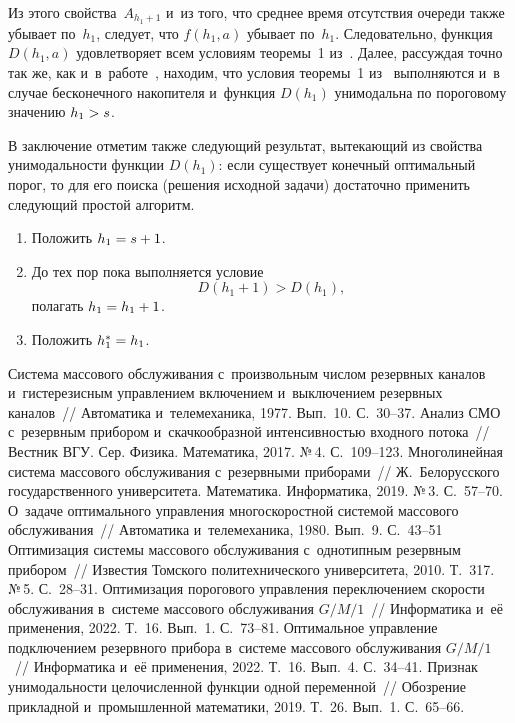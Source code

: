 \begin{multicols}{2}
   Из этого свойства~$A_{h_1+1}$ и~из того, что сред\-нее время отсутствия 
очереди также убывает по~$h_1$, следует, что $f(h_1,a)$ убывает по~$h_1$. 
Следовательно, функция $D(h_1,a)$ удовлетворяет всем условиям тео\-ре\-мы~1 
из~\cite{8-al}. Далее, рас\-суж\-дая точ\-но так же, как и~в~работе~\cite{7-al}, 
находим, что условия тео\-ре\-мы~1 из~\cite{8-al} выполняются и~в случае 
бесконечного накопителя и~функция $D(h_1)$ унимодальна по пороговому 
значению $h_1\hm>s$.
    
  В заключение отметим также сле\-ду\-ющий результат, вытекающий из свойства 
уни\-мо\-даль\-ности функции $D(h_1)$: если существует конечный оптимальный 
порог, то для его поиска (решения исходной задачи) достаточно применить 
сле\-ду\-ющий прос\-той алгоритм.
  \begin{enumerate}[1.]
\item Положить $h_1\hm= s\hm+1$. 
\item До тех пор пока выполняется условие 
$$
D\left(h_1+1\right)> D\left(h_1\right),
$$ 
полагать $h_1 \hm= h_1\hm+1$.
\item Положить $h_1^*\hm=h_1$. 
\end{enumerate}

{\small\frenchspacing
 {%
 \begin{thebibliography}{9}
 Система массового обслуживания с~произвольным чис\-лом резервных 
каналов и~гистерезисным управ\-ле\-ни\-ем вклю\-че\-ни\-ем и~вы\-клю\-че\-ни\-ем резервных 
каналов~// Автоматика и~телемеханика, 1977. Вып.~10. С.~30--37.
 Анализ СМО с~резервным прибором 
и~скачкообразной интенсивностью вход\-но\-го потока~// Вестник ВГУ. Сер. Физика. 
Математика, 2017. №\,4. С.~109--123.
 Многолинейная сис\-те\-ма массового обслуживания с~резервными 
приборами~// Ж.~Белорусского государственного университета. Математика. 
Информатика, 2019. №\,3. С.~57--70.
 О~задаче оптимального управ\-ле\-ния многоскоростной сис\-те\-мой 
массового обслуживания~// Автоматика и~телемеханика, 1980. Вып.~9. С.~43--51 
 Оптимизация сис\-те\-мы массового обслуживания 
с~однотипным резервным прибором~// Известия Томского политехнического университета, 
2010. Т.~317. №\,5. С.~28--31.
 Оптимизация порогового управ\-ле\-ния переключением скорости 
обслуживания в~сис\-те\-ме массового обслуживания $G/M/1$~// Информатика и~её 
применения, 2022. Т.~16. Вып.~1. С.~73--81.
 Оптимальное управ\-ле\-ние подключением резервного прибора  
в~сис\-те\-ме массового обслуживания $G/M/1$~// Информатика и~её применения, 2022. 
Т.~16. Вып.~4. С.~34--41.
 Признак унимодальности це\-ло\-чис\-лен\-ной функции одной переменной~// 
Обозрение при\-клад\-ной и~промышленной математики, 2019. Т.~26. Вып.~1. С.~65--66.
\end{thebibliography}

 }
 }

\end{multicols}

